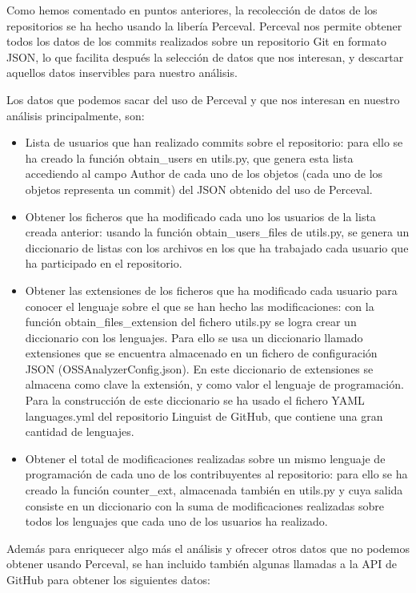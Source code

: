 \documentclass[a4paper, 12pt]{book}
\begin{document}
Como hemos comentado en puntos anteriores, la recolección de datos de los repositorios se ha hecho usando la libería Perceval. Perceval nos permite obtener todos los datos de los commits realizados sobre un repositorio Git en formato JSON, lo que facilita después la selección de datos que nos interesan, y descartar aquellos datos inservibles para nuestro análisis.



Los datos que podemos sacar del uso de Perceval y que nos interesan en nuestro análisis principalmente, son:

\begin{itemize}
  \item Lista de usuarios que han realizado commits sobre el repositorio: para ello se ha creado la función obtain\_users en utils.py, que genera esta lista accediendo al campo Author de cada uno de los objetos (cada uno de los objetos representa un commit) del JSON obtenido del uso de Perceval.
  \item Obtener los ficheros que ha modificado cada uno los usuarios de la lista creada anterior: usando la función obtain\_users\_files de utils.py, se genera un diccionario de listas con los archivos en los que ha trabajado cada usuario que ha participado en el repositorio.
  \item Obtener las extensiones de los ficheros que ha modificado cada usuario para conocer el lenguaje sobre el que se han hecho las modificaciones: con la función obtain\_files\_extension del fichero utils.py se logra crear un diccionario con los lenguajes. Para ello se usa un diccionario llamado extensiones que se encuentra almacenado en un fichero de configuración JSON (OSSAnalyzerConfig.json). En este diccionario de extensiones se almacena como clave la extensión, y como valor el lenguaje de programación. Para la construcción de este diccionario se ha usado el fichero YAML languages.yml del repositorio Linguist de GitHub, que contiene una gran cantidad de lenguajes.
  \item Obtener el total de modificaciones realizadas sobre un mismo lenguaje de programación de cada uno de los contribuyentes al repositorio: para ello se ha creado la función counter\_ext, almacenada también en utils.py y cuya salida consiste en un diccionario con la suma de modificaciones realizadas sobre todos los lenguajes que cada uno de los usuarios ha realizado.
\end{itemize}

Además para enriquecer algo más el análisis y ofrecer otros datos que no podemos obtener usando Perceval, se han incluido también algunas llamadas a la API de GitHub para obtener los siguientes datos:
\end{document}
